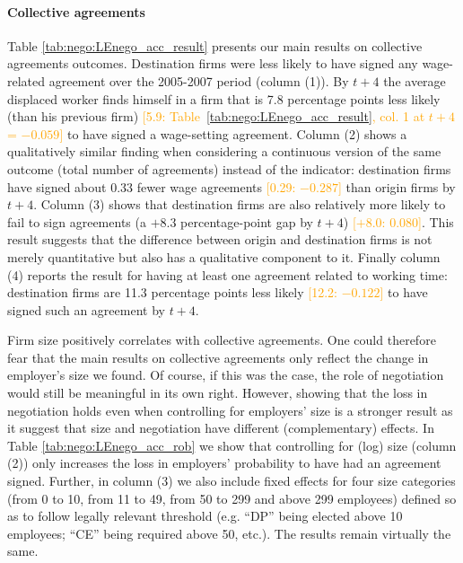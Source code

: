 \paragraph{Collective agreements}
Table \ref{tab:nego:LEnego_acc_result} presents our main results on collective agreements outcomes. Destination firms were less likely to have signed any wage-related agreement over the 2005-2007 period (column (1)). By $t+4$ the average displaced worker finds himself in a firm that is 7.8 percentage points less likely (than his previous firm) \textcolor{orange}{[5.9: Table~\ref{tab:nego:LEnego_acc_result}, col. 1 at $t+4$ = $-0.059$]} to have signed a wage-setting agreement. Column (2) shows a qualitatively similar finding when considering a continuous version of the same outcome (total number of agreements) instead of the indicator: destination firms have signed about 0.33 fewer wage agreements \textcolor{orange}{[0.29: $-0.287$]} than origin firms by $t+4$. Column (3) shows that destination firms are also relatively more likely to fail to sign agreements (a $+8.3$ percentage-point gap by $t+4$) \textcolor{orange}{[$+8.0$: 0.080]}. This result suggests that the difference between origin and destination firms is not merely quantitative but also has a qualitative component to it. Finally column (4) reports the result for having at least one agreement related to working time: destination firms are 11.3 percentage points less likely \textcolor{orange}{[12.2: $-0.122$]} to have signed such an agreement by $t+4$.


Firm size positively correlates with collective agreements. One could therefore fear that the main results on collective agreements only reflect the change in employer's size we found. Of course, if this was the case, the role of negotiation would still be meaningful in its own right. However, showing that the loss in negotiation holds even when controlling for employers' size is a stronger result as it suggest that size and negotiation have different (complementary) effects. In Table \ref{tab:nego:LEnego_acc_rob} we show that controlling for (log) size (column (2)) only increases the loss in employers' probability to have had an agreement signed. Further, in column (3) we also include fixed effects for four size categories (from 0 to 10, from 11 to 49, from 50 to 299 and above 299 employees) defined so as to follow legally relevant threshold (e.g. ``DP'' being elected above 10 employees; ``CE'' being required above 50, etc.). The results remain virtually the same. 


